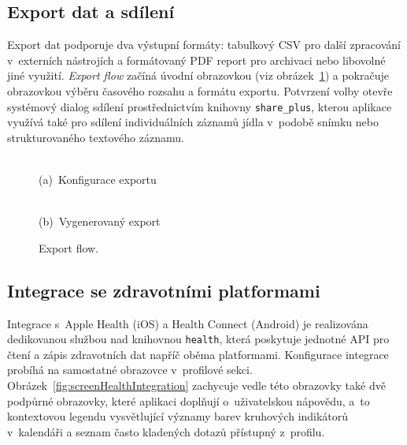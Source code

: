 \subsection{Export dat a sdílení}
\label{subsec:exportDat}

Export dat podporuje dva výstupní formáty: tabulkový CSV pro další zpracování v~externích nástrojích a formátovaný PDF report pro archivaci nebo libovolné jiné využití.
\emph{Export flow} začíná úvodní obrazovkou (viz obrázek~\ref{fig:screenExport}) a pokračuje obrazovkou výběru časového rozsahu a formátu exportu.
Potvrzení volby otevře systémový dialog sdílení prostřednictvím knihovny \texttt{share\_plus}, kterou aplikace využívá také pro sdílení individuálních záznamů jídla v~podobě snímku nebo strukturovaného textového záznamu.

\begin{figure}[!htb]
	\centering
	\begin{minipage}[t]{0.31\textwidth}
		\centering
		\\(a)~Konfigurace exportu
	\end{minipage}\hspace{3em}
	\begin{minipage}[t]{0.31\textwidth}
		\centering
		\\(b)~Vygenerovaný export
	\end{minipage}
	\caption{Export flow.}
	\label{fig:screenExport}
\end{figure}

\subsection{Integrace se zdravotními platformami}
\label{subsec:zdravotniIntegrace}

Integrace s~Apple Health (iOS) a Health Connect (Android) je realizována dedikovanou službou nad knihovnou \texttt{health}, která poskytuje jednotné API pro čtení a zápis zdravotních dat napříč oběma platformami.
Konfigurace integrace probíhá na samostatné obrazovce v~profilové sekci.
Obrázek~\ref{fig:screenHealthIntegration} zachycuje vedle této obrazovky také dvě podpůrné obrazovky, které aplikaci doplňují o~uživatelskou nápovědu, a~to kontextovou legendu vysvětlující významy barev kruhových indikátorů v~kalendáři a seznam často kladených dotazů přístupný z~profilu.

